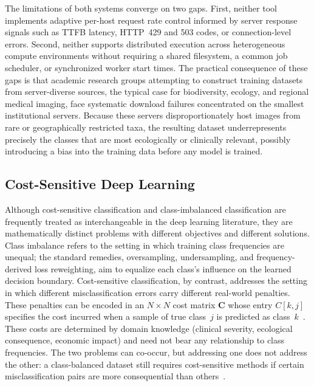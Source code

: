 \documentclass[11pt, letterpaper]{article}
\begin{document}
The limitations of both systems converge on two gaps. First, neither tool
implements adaptive per-host request rate control informed by server response
signals such as TTFB latency, HTTP~429 and 503 codes, or connection-level
errors. Second, neither supports distributed execution across heterogeneous
compute environments without requiring a shared filesystem, a common job
scheduler, or synchronized worker start times. The practical consequence of
these gaps is that academic research groups attempting to construct training
datasets from server-diverse sources, the typical case for biodiversity,
ecology, and regional medical imaging, face systematic download failures
concentrated on the smallest institutional servers. Because these servers
disproportionately host images from rare or geographically restricted taxa, the
resulting dataset underrepresents precisely the classes that are most
ecologically or clinically relevant, possibly introducing a bias into the training data
before any model is trained.

\subsection{Cost-Sensitive Deep Learning}

Although cost-sensitive classification and class-imbalanced classification are
frequently treated as interchangeable in the deep learning literature, they are
mathematically distinct problems with different objectives and different
solutions. Class imbalance refers to the setting in which training class
frequencies are unequal; the standard remedies, oversampling, undersampling,
and frequency-derived loss reweighting, aim to equalize each class's influence
on the learned decision boundary. Cost-sensitive classification, by contrast,
addresses the setting in which different misclassification errors carry different
real-world penalties. These penalties can be encoded in an $N \times N$ cost matrix $\mathbf{C}$ whose
entry $C[k,j]$ specifies the cost incurred when a sample of true class~$j$ is
predicted as class~$k$~\cite{elkan2001}. These costs are determined by domain
knowledge (clinical severity, ecological consequence, economic impact) and
need not bear any relationship to class frequencies. The two problems can
co-occur, but addressing one does not address the other: a class-balanced
dataset still requires cost-sensitive methods if certain misclassification pairs
are more consequential than others~\cite{elkan2001,ling2008costsensitive}.
\end{document}
